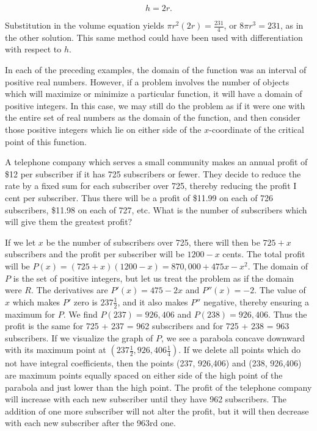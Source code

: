 \begin{example}
$$
h= 2r.
$$

\noindent Substitution in the volume equation yields $\pi r^{2}(2r) = \frac{231}{4}$, or $8 \pi r^3 = 231$, as in the other solution. This same method could have been used with differentiation with respect to $h$.

In each of the preceding examples, the domain of the function was an interval of positive real numbers. However, if a problem involves the number of objects which will maximize or minimize a particular function, it will have a domain of positive integers. In this case, we may still do the problem as if it were one with the entire set of real numbers as the domain of the function, and then consider those positive integers which lie on either side of the $x$-coordinate of the critical point of this function.
\end{example}

\begin{example}
\label{exam 2.2.3}
A telephone company which serves a small community makes an annual profit of \$12 per subscriber if it has 725 subscribers or fewer. They
decide to reduce the rate by a fixed sum for each subscriber over 725, thereby reducing the profit I cent per subscriber. Thus there will be a profit of \$11.99 on each of 726 subscribers, \$11.98 on each of 727, etc. What is the number of subscribers which will give them the greatest profit?

If we let $x$ be the number of subscribers over 725, there will then be $725 + x$ subscribers and the profit per subscriber will be $1200 - x$ cents. The total profit will be $P(x) = (725 + x)(1200 - x) = 870,000 + 475x - x^2$. The domain of $P$ is the set of positive integers, but let us treat the problem as if the domain were $R$. The derivatives are $P'(x)= 475 - 2x$ and $P''(x) = -2$. The value of $x$ which makes $P'$ zero is $237\frac{1}{2}$, and it also makes $P''$ negative, thereby ensuring a maximum for $P$. We find $P(237) = 926,406$ and $P(238) = 926,406$. Thus the profit is the same for 725 + 237 = 962 subscribers and for 725 + 238 = 963 subscribers. If we visualize the graph of $P$, we see a parabola concave downward with its maximum point at $(237\frac{1}{2}, 926,406\frac{1}{4})$. If we delete all points which do not have integral coefficients, then the points (237, 926,406) and (238, 926,406) are maximum points equally spaced on either side of the high point of the parabola and just lower than the high point. The profit of the telephone company will increase with each new subscriber until they have 962 subscribers. The addition of one more subscriber will not alter the profit, but it will then decrease with each new subscriber after the 963rd one.
\end{example}

